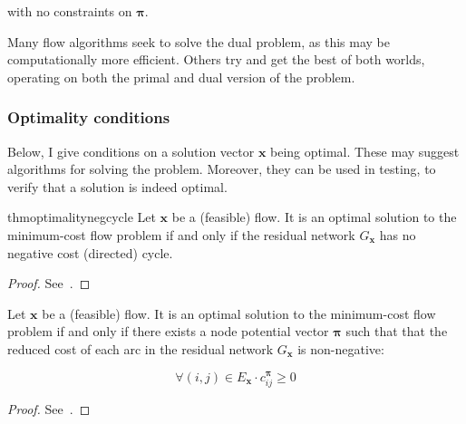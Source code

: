 with no constraints on $\boldsymbol{\pi}$.

Many flow algorithms seek to solve the dual problem, as this may be computationally more efficient. Others try and get the best of both worlds, operating on both the primal and dual version of the problem.

\subsubsection{Optimality conditions} \label{sec:prep-flow-optimality}


Below, I give conditions on a solution vector $\mathbf{x}$ being optimal. These may suggest algorithms for solving the problem. Moreover, they can be used in testing, to verify that a solution is indeed optimal.\\

\begin{restatable}{thm}{optimalitynegcycle}
\label{thm:optimality-neg-cycle}
Let $\mathbf{x}$ be a (feasible) flow. It is an optimal solution to the minimum-cost flow problem if and only if the residual network $G_\mathbf{x}$ has no negative cost (directed) cycle.
\end{restatable}
\begin{proof}
See~\cite[p.~307]{Ahuja:1993}.
\end{proof}

\begin{thm} \label{thm:optimality-reduced-cost}
Let $\mathbf{x}$ be a (feasible) flow. It is an optimal solution to the minimum-cost flow problem if and only if there exists a node potential vector $\boldsymbol{\pi}$ such that that the reduced cost of each arc in the residual network $G_{\mathbf{x}}$ is non-negative:

\begin{equation} \label{eq:optimality-reduced-cost}
\forall(i,j)\in E_{\mathbf{x}}\cdot c_{ij}^{\boldsymbol{\pi}}\geq 0
\end{equation}
\end{thm}
\begin{proof}
See~\cite[p.~309]{Ahuja:1993}.
\end{proof}

